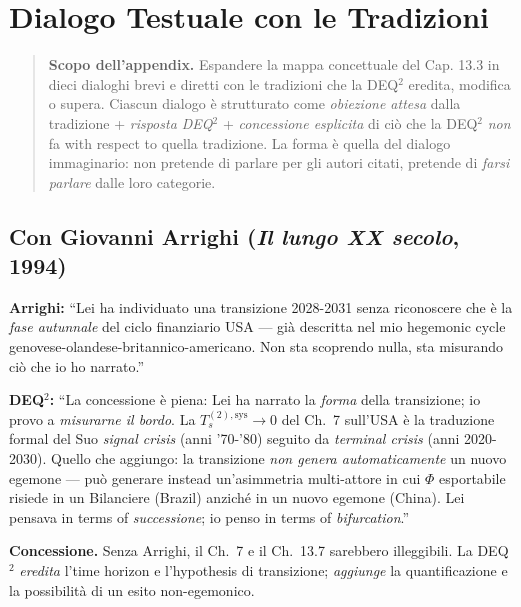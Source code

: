 \chapter{Dialogo Testuale con le
Tradizioni}\label{dialogo-testuale-con-le-tradizioni}

\begin{quote}
\textbf{Scopo dell'appendix.} Espandere la mappa concettuale del Cap.
13.3 in dieci dialoghi brevi e diretti con le tradizioni che la DEQ$^2$
eredita, modifica o supera. Ciascun dialogo è strutturato come
\emph{obiezione attesa} dalla tradizione + \emph{risposta DEQ$^2$} +
\emph{concessione esplicita} di ciò che la DEQ$^2$ \emph{non} fa with respect to
quella tradizione. La forma è quella del dialogo immaginario: non
pretende di parlare per gli autori citati, pretende di \emph{farsi
parlare} dalle loro categorie.
\end{quote}



\section{\texorpdfstring{Con Giovanni Arrighi (\emph{Il lungo XX
secolo},
1994)}{Con Giovanni Arrighi (Il lungo XX secolo, 1994)}}\label{con-giovanni-arrighi-il-lungo-xx-secolo-1994}

\textbf{Arrighi:} ``Lei ha individuato una transizione 2028-2031 senza
riconoscere che è la \emph{fase autunnale} del ciclo finanziario USA ---
già descritta nel mio hegemonic cycle
genovese-olandese-britannico-americano. Non sta scoprendo nulla, sta
misurando ciò che io ho narrato.''

\textbf{DEQ$^2$:} ``La concessione è piena: Lei ha narrato la \emph{forma}
della transizione; io provo a \emph{misurarne il bordo}. La
\(T_s^{(2),\text{sys}} \to 0\) del Ch.~7 sull'USA è la traduzione
formal del Suo \emph{signal crisis} (anni '70-'80) seguito da
\emph{terminal crisis} (anni 2020-2030). Quello che aggiungo: la
transizione \emph{non genera automaticamente} un nuovo egemone --- può
generare instead un'asimmetria multi-attore in cui \(\Phi\) esportabile
risiede in un Bilanciere (Brazil) anziché in un nuovo egemone (China).
Lei pensava in terms of \emph{successione}; io penso in terms of
\emph{bifurcation}.''

\textbf{Concessione.} Senza Arrighi, il Ch.~7 e il Ch.~13.7 sarebbero
illeggibili. La DEQ$^2$ \emph{eredita} l'time horizon e l'hypothesis di
transizione; \emph{aggiunge} la quantificazione e la possibilità di un
esito non-egemonico.



